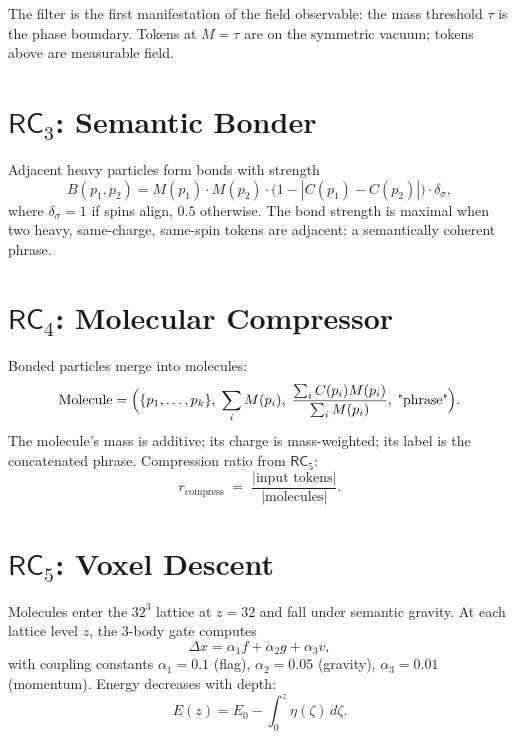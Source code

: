 \documentclass[11pt,twoside]{article}
\theoremstyle{plain}
\theoremstyle{definition}
\theoremstyle{remark}
\newcommand{\RC}[1]{\textsf{RC}_{#1}}
\begin{document}
The filter is the first manifestation of the field observable: the mass
threshold $\tau$ is the phase boundary.  Tokens at $M=\tau$ are on the
symmetric vacuum; tokens above are measurable field.

\section{\texorpdfstring{$\RC{3}$}{RC3}: Semantic Bonder}

Adjacent heavy particles form bonds with strength
\begin{equation}\label{eq:bond}
  B(p_1,p_2) = M(p_1)\cdot M(p_2)\cdot\bigl(1 - |C(p_1)-C(p_2)|\bigr)\cdot\delta_\sigma,
\end{equation}
where $\delta_\sigma = 1$ if spins align, $0.5$ otherwise.  The bond strength
is maximal when two heavy, same-charge, same-spin tokens are adjacent: a
semantically coherent phrase.

\section{\texorpdfstring{$\RC{4}$}{RC4}: Molecular Compressor}

Bonded particles merge into molecules:
\begin{equation}
  \mathrm{Molecule} = \Bigl(\{p_1,\ldots,p_k\},\;\sum_i M(p_i),\;
  \frac{\sum_i C(p_i)M(p_i)}{\sum_i M(p_i)},\;\text{"phrase"}\Bigr).
\end{equation}
The molecule's mass is additive; its charge is mass-weighted; its label is the
concatenated phrase.  Compression ratio from $\RC{5}$:
\begin{equation}
  r_{\mathrm{compress}} \;=\; \frac{|\text{input tokens}|}{|\text{molecules}|}.
\end{equation}

\section{\texorpdfstring{$\RC{5}$}{RC5}: Voxel Descent}

Molecules enter the $32^3$ lattice at $z=32$ and fall under semantic gravity.
At each lattice level $z$, the 3-body gate computes
\begin{equation}\label{eq:voxel-gate}
  \Delta x = \alpha_1 f + \alpha_2 g + \alpha_3 v,
\end{equation}
with coupling constants $\alpha_1=0.1$ (flag), $\alpha_2=0.05$ (gravity),
$\alpha_3=0.01$ (momentum).  Energy decreases with depth:
\begin{equation}
  E(z) = E_0 - \int_0^z \eta(\zeta)\,d\zeta.
\end{equation}
\end{document}
